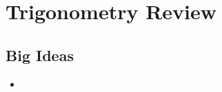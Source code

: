 \chapter{Trigonometry Review}
\label{chap:TR}

\section{Big Ideas}
\label{sec:TR Big Ideas}
\begin{itemize}
  \item 
\end{itemize}
